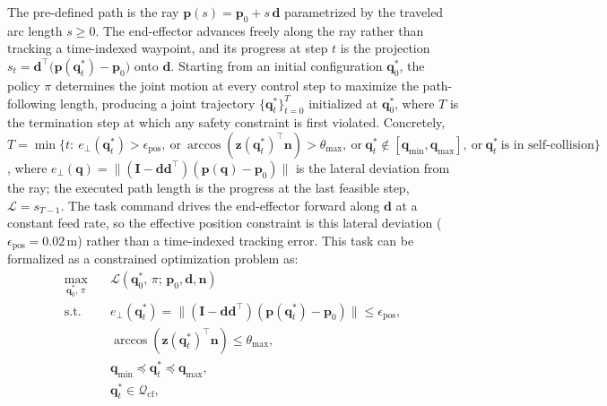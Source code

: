 \documentclass[journal, twoside]{IEEEtran}
\newcommand{\rst}[1]{{\color{rstcolor}#1}}
\begin{document}
\rst{The pre-defined path is the ray $\mathbf{p}(s)=\mathbf{p}_{0}+s\,\mathbf{d}$ parametrized by the traveled arc length $s\ge 0$. The end-effector advances freely along the ray rather than tracking a time-indexed waypoint, and its progress at step $t$ is the projection $s_{t}=\mathbf{d}^{\top}\!\big(\mathbf{p}(\mathbf{q}_{t}^{*})-\mathbf{p}_{0}\big)$ onto $\mathbf{d}$.} Starting from an initial configuration $\mathbf{q}_{0}^{*}$, the policy $\pi$ determines the joint motion at every control step to maximize the path-following length, producing a joint trajectory $\{\mathbf{q}_{t}^{*}\}_{t=0}^{T}$ initialized at $\mathbf{q}_{0}^{*}$, where $T$ is the termination step at which any safety constraint is first violated. \rst{Concretely, $T=\min\{t:\ e_{\perp}(\mathbf{q}_{t}^{*})>\epsilon_{\text{pos}},\ \text{or}\ \arccos(\mathbf{z}(\mathbf{q}_{t}^{*})^{\top}\mathbf{n})>\theta_{\max},\ \text{or}\ \mathbf{q}_{t}^{*}\notin[\mathbf{q}_{\min},\mathbf{q}_{\max}],\ \text{or}\ \mathbf{q}_{t}^{*}\ \text{is in self-collision}\}$, where $e_{\perp}(\mathbf{q})=\|(\mathbf{I}-\mathbf{d}\mathbf{d}^{\top})(\mathbf{p}(\mathbf{q})-\mathbf{p}_{0})\|$ is the lateral deviation from the ray; the executed path length is the progress at the last feasible step, $\mathcal{L}=s_{T-1}$. The task command drives the end-effector forward along $\mathbf{d}$ at a constant feed rate, so the effective position constraint is this lateral deviation ($\epsilon_{\text{pos}}{=}0.02$\,m) rather than a time-indexed tracking error.} This task can be formalized as a constrained optimization problem as:
\begin{align}
\max_{\mathbf{q}_{0}^{*},\,\pi} \quad & \mathcal{L}(\mathbf{q}^{*}_{0},\,\pi;\,\mathbf{p}_{0}, \mathbf{d}, \mathbf{n}) \\
\text{s.t.} \quad & e_{\perp}(\mathbf{q}_{t}^{*}) = \big\|(\mathbf{I}-\mathbf{d}\mathbf{d}^{\top})(\mathbf{p}(\mathbf{q}_{t}^{*})-\mathbf{p}_{0})\big\| \leq \epsilon_{\text{pos}}, \\
& \arccos\!\left( \mathbf{z}(\mathbf{q}_{t}^{*})^{\top} \mathbf{n} \right) \leq \theta_{\max}, \label{eq:ori_constraint} \\
& \mathbf{q}_{\min} \preceq \mathbf{q}_{t}^{*} \preceq \mathbf{q}_{\max}, \label{eq:jl_constraint} \\
& \mathbf{q}_{t}^{*} \in \mathcal{Q}_{\mathrm{cf}}, \label{eq:collision_constraint}
\end{align}
\end{document}
